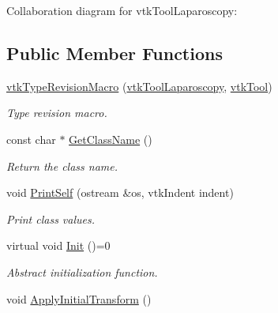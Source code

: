 Collaboration diagram for vtkToolLaparoscopy:\subsection*{Public Member Functions}
\begin{DoxyCompactItemize}
\item 
\hypertarget{classvtkToolLaparoscopy_a972d62685a18d4f960f75859745ef84b}{
\hyperlink{classvtkToolLaparoscopy_a972d62685a18d4f960f75859745ef84b}{vtkTypeRevisionMacro} (\hyperlink{classvtkToolLaparoscopy}{vtkToolLaparoscopy}, \hyperlink{classvtkTool}{vtkTool})}
\label{classvtkToolLaparoscopy_a972d62685a18d4f960f75859745ef84b}

\begin{DoxyCompactList}\small\item\em Type revision macro. \item\end{DoxyCompactList}\item 
\hypertarget{classvtkToolLaparoscopy_ad44b0b82bd511ef8c2b67053145450f6}{
const char $\ast$ \hyperlink{classvtkToolLaparoscopy_ad44b0b82bd511ef8c2b67053145450f6}{GetClassName} ()}
\label{classvtkToolLaparoscopy_ad44b0b82bd511ef8c2b67053145450f6}

\begin{DoxyCompactList}\small\item\em Return the class name. \item\end{DoxyCompactList}\item 
\hypertarget{classvtkToolLaparoscopy_a87de6397c41e834633bc532f7338b904}{
void \hyperlink{classvtkToolLaparoscopy_a87de6397c41e834633bc532f7338b904}{PrintSelf} (ostream \&os, vtkIndent indent)}
\label{classvtkToolLaparoscopy_a87de6397c41e834633bc532f7338b904}

\begin{DoxyCompactList}\small\item\em Print class values. \item\end{DoxyCompactList}\item 
virtual void \hyperlink{classvtkToolLaparoscopy_ace75ea21a3ddb27547976ddea0ebb60e}{Init} ()=0
\begin{DoxyCompactList}\small\item\em Abstract initialization function. \item\end{DoxyCompactList}\item 
\hypertarget{classvtkToolLaparoscopy_a55c7ce0e9156ae3547dbe32a4fef1057}{
void \hyperlink{classvtkToolLaparoscopy_a55c7ce0e9156ae3547dbe32a4fef1057}{ApplyInitialTransform} ()}
\label{classvtkToolLaparoscopy_a55c7ce0e9156ae3547dbe32a4fef1057}


\end{DoxyCompactItemize}
